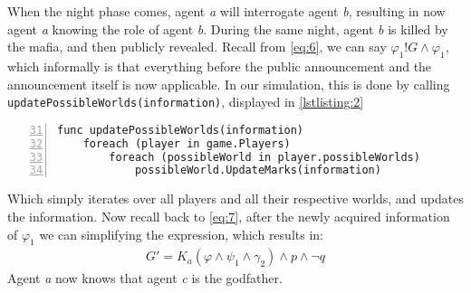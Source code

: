 When the night phase comes, agent \textit{a} will interrogate agent \textit{b}, resulting in now agent \textit{a} knowing the role of agent \textit{b}. During the same night, agent \textit{b} is killed by the mafia, and then publicly revealed. Recall from \cref{eq:6}, we can say $\varphi_1!G\land\varphi_1$, which informally is that everything before the public announcement and the announcement itself is now applicable. In our simulation, this is done by calling \lstinline[]{updatePossibleWorlds(information)}, displayed in \ref{lstlisting:2} 
\begin{lstlisting}[basicstyle=\footnotesize\ttfamily, numbers=left, xleftmargin=0.5cm, firstnumber=31, caption={Snippet from appendix C \label{lstlisting:2}}, captionpos=b]
func updatePossibleWorlds(information)
	foreach (player in game.Players)
		foreach (possibleWorld in player.possibleWorlds)
			possibleWorld.UpdateMarks(information)
\end{lstlisting}
Which simply iterates over all players and all their respective worlds, and updates the information. Now recall back to \cref{eq:7}, after the newly acquired information of $\varphi_1$ we can simplifying the expression, which results in:
\begin{align}
G' = K_a(\varphi \land \psi_1 \land \gamma_2) \land p \land \neg q
\end{align}
Agent \textit{a} now knows that agent \textit{c} is the godfather.